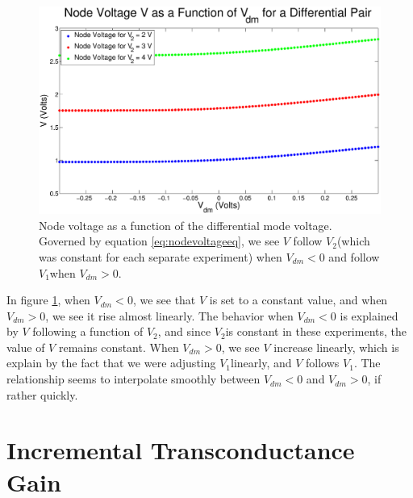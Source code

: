 \documentclass{article}
\newcommand{\Vtwo}{{$V_{2}$}}
\newcommand{\Vone}{{$V_{1}$}}
\begin{document}
\begin{figure}[H]
\centering
\includegraphics[width=\linewidth]{./Figures/NodeVoltageWeakInversion.eps}
\caption{Node voltage as a function of the differential mode voltage. Governed by equation \ref{eq:nodevoltageeq}, we see $V$ follow \Vtwo (which was constant for each separate experiment) when $V_{dm} < 0$ and follow \Vone when $V_{dm} > 0$.}
\label{fig:nodevoltageWI}
\end{figure}

In figure \ref{fig:nodevoltageWI}, when $V_{dm} < 0$, we see that $V$ is set to a constant value, and when $V_{dm} > 0$, we see it rise almost linearly. The behavior when $V_{dm} < 0$ is explained by $V$ following a function of \Vtwo, and since \Vtwo is constant in these experiments, the value of $V$ remains constant. When $V_{dm} > 0$, we see $V$ increase linearly, which is explain by the fact that we were adjusting \Vone linearly, and $V$ follows \Vone. The relationship seems to interpolate smoothly between $V_{dm} < 0$ and $V_{dm} > 0$, if rather quickly.



\section*{Incremental Transconductance Gain}
\end{document}
